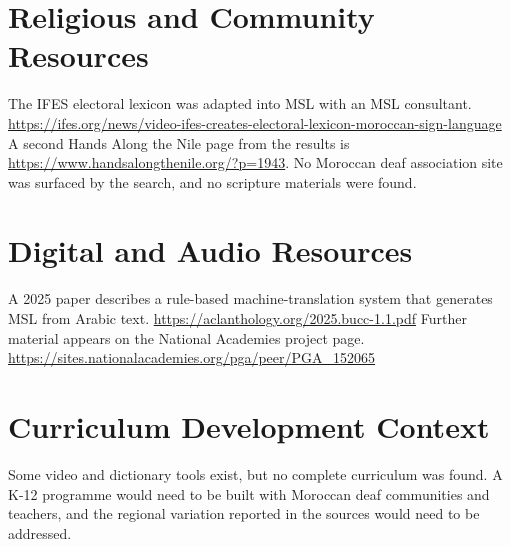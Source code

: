\documentclass[12pt]{article}
\begin{document}
\section{Religious and Community Resources}
The IFES electoral lexicon was adapted into MSL with an MSL consultant. \url{https://ifes.org/news/video-ifes-creates-electoral-lexicon-moroccan-sign-language} A second Hands Along the Nile page from the results is \url{https://www.handsalongthenile.org/?p=1943}. No Moroccan deaf association site was surfaced by the search, and no scripture materials were found.

\section{Digital and Audio Resources}
A 2025 paper describes a rule-based machine-translation system that generates MSL from Arabic text. \url{https://aclanthology.org/2025.bucc-1.1.pdf} Further material appears on the National Academies project page. \url{https://sites.nationalacademies.org/pga/peer/PGA_152065}

\section{Curriculum Development Context}
Some video and dictionary tools exist, but no complete curriculum was found. A K-12 programme would need to be built with Moroccan deaf communities and teachers, and the regional variation reported in the sources would need to be addressed.
\end{document}
